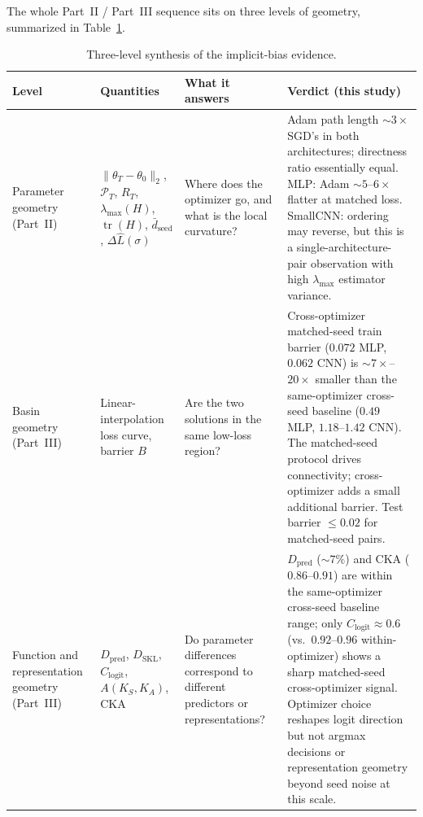 \documentclass[11pt]{article}
\begin{document}
The whole Part~II / Part~III sequence sits on three levels of geometry, summarized in Table~\ref{tab:three-level}.

\begin{table}[H]
\centering
\small
\setlength{\tabcolsep}{3pt}
\begin{tabular}{p{2.4cm}p{4.8cm}p{4.5cm}p{3.5cm}}
\toprule
\textbf{Level} & \textbf{Quantities} & \textbf{What it answers} & \textbf{Verdict (this study)} \\
\midrule
Parameter geometry (Part~II) & $\|\theta_T-\theta_0\|_2$, $\mathcal{P}_T$, $R_T$, $\lambda_{\max}(H)$, $\operatorname{tr}(H)$, $\bar d_{\mathrm{seed}}$, $\Delta\widehat L(\sigma)$ & Where does the optimizer go, and what is the local curvature? & Adam path length $\sim 3\times$ SGD's in both architectures; directness ratio essentially equal. MLP: Adam $\sim 5$--$6\times$ flatter at matched loss. SmallCNN: ordering may reverse, but this is a single-architecture-pair observation with high $\lambda_{\max}$ estimator variance. \\
\addlinespace
Basin geometry (Part~III) & Linear-interpolation loss curve, barrier $B$ & Are the two solutions in the same low-loss region? & Cross-optimizer matched-seed train barrier ($0.072$ MLP, $0.062$ CNN) is $\sim 7\times$--$20\times$ smaller than the same-optimizer cross-seed baseline ($0.49$ MLP, $1.18$--$1.42$ CNN). The matched-seed protocol drives connectivity; cross-optimizer adds a small additional barrier. Test barrier $\le 0.02$ for matched-seed pairs. \\
\addlinespace
Function and representation geometry (Part~III) & $D_{\mathrm{pred}}$, $D_{\mathrm{SKL}}$, $C_{\mathrm{logit}}$, $A(K_S,K_A)$, CKA & Do parameter differences correspond to different predictors or representations? & $D_{\mathrm{pred}}$ ($\sim 7\%$) and CKA ($0.86$--$0.91$) are within the same-optimizer cross-seed baseline range; only $C_{\mathrm{logit}}\approx 0.6$ (vs.\ $0.92$--$0.96$ within-optimizer) shows a sharp matched-seed cross-optimizer signal. Optimizer choice reshapes logit direction but not argmax decisions or representation geometry beyond seed noise at this scale. \\
\bottomrule
\end{tabular}
\caption{Three-level synthesis of the implicit-bias evidence.}
\label{tab:three-level}
\end{table}
\end{document}
